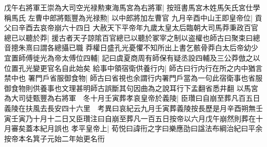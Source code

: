 戊午右將軍王崇為大司空光禄勲東海馬宮為右將軍|{
	按班書馬宮木姓馬矢氏宮仕學稱馬氏}
左曹中郎將甄豐為光禄勲|{
	以中郎將加左曹官}
九月辛酉中山王即皇帝位|{
	貢父曰辛酉去哀帝崩六十四日}
大赦天下平帝年九歲太皇太后臨朝大司馬莽秉政百官總已以聽於莽|{
	援古者天子諒隂百官總已以聽於冢宰之制以盗權也師古曰聚束曰總音摠朱熹曰謂各總攝已職}
莽權日盛孔光憂懼不知所出上書乞骸骨莽白太后帝幼少宜置師傅徙光為帝太傅位四輔|{
	記曰虞夏商周有師保有疑丞設四輔及三公莽倣之以位置孔光變更官名自此始矣}
給事中領宿衛供養行内|{
	師古曰行内行在所之内中猶言禁中也}
署門戶省服御食物|{
	師古曰省視也余謂行内署門戶當為一句此宿衛事也省服御食物則供養事也文理甚明師古誤斷其句因曲為之說耳行下孟翻省悉井翻}
以馬宮為大司徒甄豐為右將軍　冬十月壬寅葬孝哀皇帝於義陵|{
	臣瓚曰自崩至葬凡百五日義陵在扶風去長安四十六里　考異曰哀紀云九月壬寅葬義陵按長歷是月辛酉朔無壬寅壬寅乃十月十二日又臣瓚注曰自崩至葬凡一百五日按帝以六月戊午崩然則葬在十月審矣蓋本紀月誤也}
孝平皇帝上|{
	荀悦曰諱衎之字曰樂應劭曰諡法布綱治紀曰平余按帝本名箕子元始二年始更名衎}


